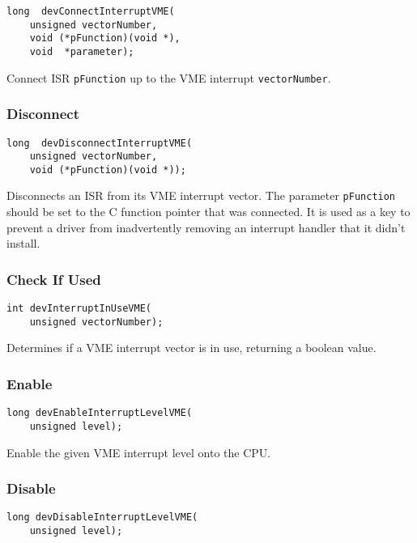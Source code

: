 \begin{verbatim}
long  devConnectInterruptVME(
    unsigned vectorNumber,
    void (*pFunction)(void *),
    void  *parameter);
\end{verbatim}

Connect ISR \verb|pFunction| up to the VME interrupt \verb|vectorNumber|.

\subsubsection{Disconnect}

\begin{verbatim}
long  devDisconnectInterruptVME(
    unsigned vectorNumber,
    void (*pFunction)(void *));
\end{verbatim}

Disconnects an ISR from its VME interrupt vector. The parameter \verb|pFunction| should be set to the C function pointer 
that was connected. It is used as a key to prevent a driver from inadvertently removing an interrupt handler that it didn't 
install.

\subsubsection{Check If Used}

\begin{verbatim}
int devInterruptInUseVME(
    unsigned vectorNumber);
\end{verbatim}

Determines if a VME interrupt vector is in use, returning a boolean value.

\subsubsection{Enable}

\begin{verbatim}
long devEnableInterruptLevelVME(
    unsigned level);
\end{verbatim}

Enable the given VME interrupt level onto the CPU.

\subsubsection{Disable}

\begin{verbatim}
long devDisableInterruptLevelVME(
    unsigned level);
\end{verbatim}


